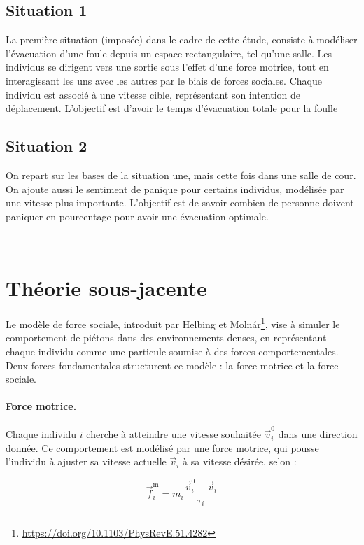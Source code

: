 \documentclass[a4paper,12pt]{article}
\begin{document}
\subsection{Situation 1}
\indent La première situation (imposée) dans le cadre de cette étude, consiste à modéliser l’évacuation d’une foule depuis un espace rectangulaire, tel qu’une salle. Les individus se dirigent vers une sortie sous l'effet d'une force motrice, tout en interagissant les uns avec les autres par le biais de forces sociales. Chaque individu est associé à une vitesse cible, représentant son intention de déplacement. L'objectif est d'avoir le temps d'évacuation totale pour la foulle

\subsection{Situation 2}
\indent On repart sur les bases de la situation une, mais cette fois dans une salle de cour. On ajoute aussi le sentiment de panique pour certains individus, modélisée par une vitesse plus importante. L'objectif est de savoir combien de personne doivent paniquer en pourcentage pour avoir une évacuation optimale.

\
\section{Théorie sous-jacente}

Le modèle de force sociale, introduit par Helbing et Molnár\footnote{\url{https://doi.org/10.1103/PhysRevE.51.4282}}, vise à simuler le comportement de piétons dans des environnements denses, en représentant chaque individu comme une particule soumise à des forces comportementales. Deux forces fondamentales structurent ce modèle : la force motrice et la force sociale.

\paragraph{Force motrice.}
Chaque individu $i$ cherche à atteindre une vitesse souhaitée $\vec{v}_i^0$ dans une direction donnée. Ce comportement est modélisé par une force motrice, qui pousse l'individu à ajuster sa vitesse actuelle $\vec{v}_i$ à sa vitesse désirée, selon :

\begin{equation}
\label{eq:force_motrice}
\vec{f}_i^{\text{m}} = m_i \frac{\vec{v}_i^0 - \vec{v}_i}{\tau_i}
\end{equation}
\end{document}
